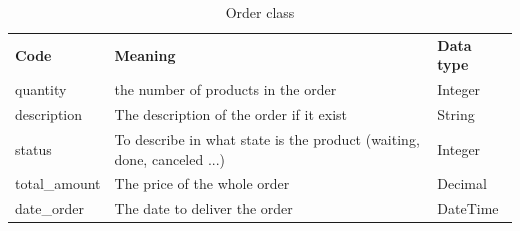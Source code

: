 \documentclass[12pt,a4paper]{report}
\begin{document}
	\begin{table}[H]
		\begin{center}
			\captionsetup[table]{skip=10pt}
			\caption{Order class}
			\setlength\doublerulesep{0.5pt}
			
			\begin{tabular}{|  p{5cm}|  p{6cm}|  p{4cm}|}
				\rowcolor{LightCyan}
				
				\hline
				\multicolumn{3}{c}{Order class}\\
				\hline 
				\textbf{Code} & \textbf{Meaning} & \textbf{Data type} 
				\\ \hline
				
				quantity &                        
				the number of products in the order &                        
				Integer                     
				
				\\ \hline
				
				description &                        
				The description of the order if it exist &                        
				String  
				\\ \hline
				
				status &                        
				To describe in what state is the product (waiting, done, canceled ...) &                        
				Integer
				\\ \hline
				
				total\_amount &                        
				The price of the whole order &                        
				Decimal
				\\ \hline
				
				date\_order &                        
				The date to deliver the order &                        
				DateTime    
				
				\\ \hline
				
			\end{tabular}
			
		\end{center}
	\end{table}
\end{document}
